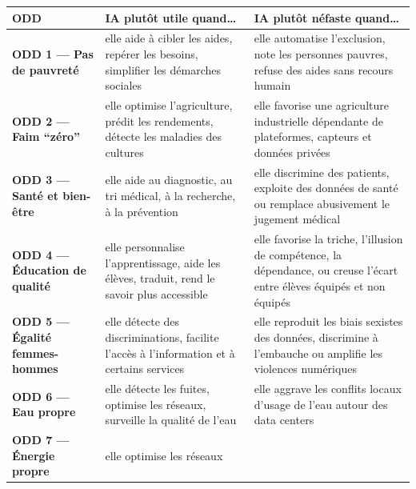 \documentclass[
  10pt,
  a4paper,
  DIV=11,
  numbers=noendperiod,
  oneside]{scrreprt}
\newcounter{none} %
\let\oldtextbf\textbf
\renewcommand{\textbf}[1]{\oldtextbf{\textcolor{cmmnavy}{#1}}}
\begin{document}
{\def\LTcaptype{none} %
\begin{longtable}[]{@{}
  >{\raggedright\arraybackslash}p{}
  >{\raggedright\arraybackslash}p{}
  >{\raggedright\arraybackslash}p{}@{}}
\toprule\noalign{}
\begin{minipage}[b]{\linewidth}\raggedright
ODD
\end{minipage} & \begin{minipage}[b]{\linewidth}\raggedright
IA plutôt utile quand\ldots{}
\end{minipage} & \begin{minipage}[b]{\linewidth}\raggedright
IA plutôt néfaste quand\ldots{}
\end{minipage} \\
\midrule\noalign{}
\endhead
\bottomrule\noalign{}
\endlastfoot
\textbf{ODD 1 --- Pas de pauvreté} & elle aide à cibler les aides,
repérer les besoins, simplifier les démarches sociales & elle automatise
l'exclusion, note les personnes pauvres, refuse des aides sans recours
humain \\
\textbf{ODD 2 --- Faim ``zéro''} & elle optimise l'agriculture, prédit
les rendements, détecte les maladies des cultures & elle favorise une
agriculture industrielle dépendante de plateformes, capteurs et données
privées \\
\textbf{ODD 3 --- Santé et bien-être} & elle aide au diagnostic, au tri
médical, à la recherche, à la prévention & elle discrimine des patients,
exploite des données de santé ou remplace abusivement le jugement
médical \\
\textbf{ODD 4 --- Éducation de qualité} & elle personnalise
l'apprentissage, aide les élèves, traduit, rend le savoir plus
accessible & elle favorise la triche, l'illusion de compétence, la
dépendance, ou creuse l'écart entre élèves équipés et non équipés \\
\textbf{ODD 5 --- Égalité femmes-hommes} & elle détecte des
discriminations, facilite l'accès à l'information et à certains services
& elle reproduit les biais sexistes des données, discrimine à l'embauche
ou amplifie les violences numériques \\
\textbf{ODD 6 --- Eau propre} & elle détecte les fuites, optimise les
réseaux, surveille la qualité de l'eau & elle aggrave les conflits
locaux d'usage de l'eau autour des data centers \\
\textbf{ODD 7 --- Énergie propre} & elle optimise les réseaux

\end{longtable}}
\end{document}
